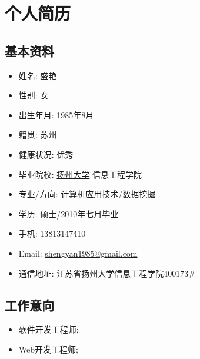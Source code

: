 \documentclass[a4paper,10pt,english]{manual}
\begin{document}


\chapter{个人简历}


\section{基本资料}
  	

\begin{itemize}
\item {} 
姓名: 盛艳

\item {} 
性别: 女

\item {} 
出生年月: 1985年8月

\item {} 
籍贯: 苏州

\item {} 
健康状况: 优秀

\item {} 
毕业院校: \href{http://www.yzu.edu.cn}{扬州大学} 信息工程学院

\item {} 
专业/方向: 计算机应用技术/数据挖掘

\item {} 
学历: 硕士/2010年七月毕业

\item {} 
手机: 13813147410

\item {} 
Email: \href{mailto:shengyan1985@gmail.com}{shengyan1985@gmail.com}

\item {} 
通信地址: 江苏省扬州大学信息工程学院400173\#

\end{itemize}

\section{工作意向}
\begin{itemize}
\item {} 
软件开发工程师;

\item {} 
Web开发工程师;


\end{itemize}
\end{document}

